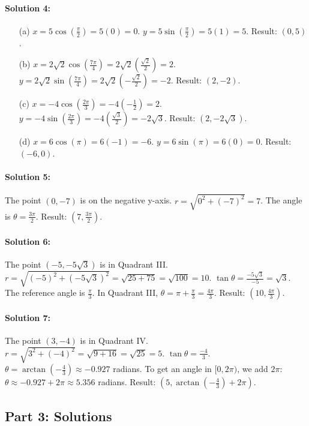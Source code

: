 \documentclass{article}
\begin{document}
\paragraph{Solution 4:}
\begin{itemize}
    \item[(a)] $x = 5\cos(\frac{\pi}{2}) = 5(0) = 0$. $y = 5\sin(\frac{\pi}{2}) = 5(1) = 5$. Result: $(0, 5)$.
    \item[(b)] $x = 2\sqrt{2}\cos(\frac{7\pi}{4}) = 2\sqrt{2}(\frac{\sqrt{2}}{2}) = 2$. $y = 2\sqrt{2}\sin(\frac{7\pi}{4}) = 2\sqrt{2}(-\frac{\sqrt{2}}{2}) = -2$. Result: $(2, -2)$.
    \item[(c)] $x = -4\cos(\frac{2\pi}{3}) = -4(-\frac{1}{2}) = 2$. $y = -4\sin(\frac{2\pi}{3}) = -4(\frac{\sqrt{3}}{2}) = -2\sqrt{3}$. Result: $(2, -2\sqrt{3})$.
    \item[(d)] $x = 6\cos(\pi) = 6(-1) = -6$. $y = 6\sin(\pi) = 6(0) = 0$. Result: $(-6, 0)$.
\end{itemize}

\paragraph{Solution 5:} The point $(0, -7)$ is on the negative y-axis.
$r = \sqrt{0^2 + (-7)^2} = 7$.
The angle is $\theta = \frac{3\pi}{2}$.
Result: $(7, \frac{3\pi}{2})$.

\paragraph{Solution 6:} The point $(-5, -5\sqrt{3})$ is in Quadrant III.
$r = \sqrt{(-5)^2 + (-5\sqrt{3})^2} = \sqrt{25 + 75} = \sqrt{100} = 10$.
$\tan\theta = \frac{-5\sqrt{3}}{-5} = \sqrt{3}$. The reference angle is $\frac{\pi}{3}$.
In Quadrant III, $\theta = \pi + \frac{\pi}{3} = \frac{4\pi}{3}$.
Result: $(10, \frac{4\pi}{3})$.

\paragraph{Solution 7:} The point $(3, -4)$ is in Quadrant IV.
$r = \sqrt{3^2 + (-4)^2} = \sqrt{9 + 16} = \sqrt{25} = 5$.
$\tan\theta = \frac{-4}{3}$.
$\theta = \arctan(-\frac{4}{3}) \approx -0.927$ radians. To get an angle in $[0, 2\pi)$, we add $2\pi$: $\theta \approx -0.927 + 2\pi \approx 5.356$ radians.
Result: $(5, \arctan(-\frac{4}{3}) + 2\pi)$.

\subsection*{Part 3: Solutions}
\end{document}
